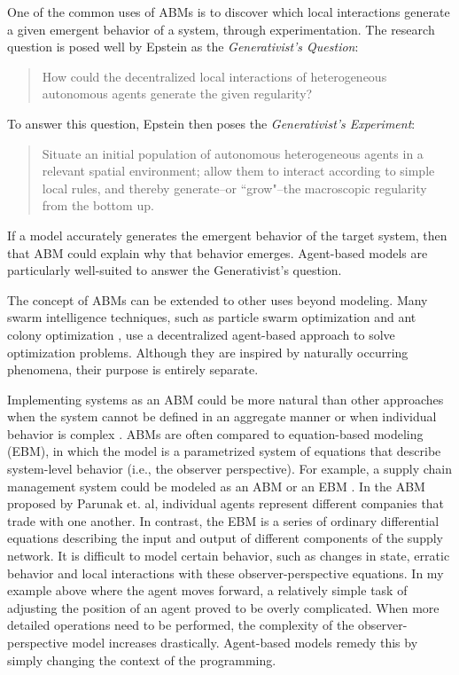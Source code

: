 One of the common uses of ABMs is to discover which local interactions generate a given emergent behavior of a system, through experimentation.
The research question is posed well by Epstein as the \textit{Generativist's Question}:
\begin{quote}
   How could the decentralized local interactions of heterogeneous autonomous agents generate the given regularity?
\end{quote}
To answer this question, Epstein then poses the \textit{Generativist's Experiment}:
\begin{quote}
Situate an initial population of autonomous heterogeneous agents in a relevant spatial environment; allow them to interact according to simple local rules, and thereby generate--or ``grow"--the macroscopic regularity from the bottom up. \cite{epstein1999agent}
\end{quote}
If a model accurately generates the emergent behavior of the target system, then that ABM could explain why that behavior emerges.
Agent-based models are particularly well-suited to answer the Generativist's question.

The concept of ABMs can be extended to other uses beyond modeling.
Many swarm intelligence techniques, such as particle swarm optimization \cite{kennedy1995pso} and ant colony optimization \cite{dorigo2004aco}, use a decentralized agent-based approach to solve optimization problems.
Although they are inspired by naturally occurring phenomena, their purpose is entirely separate.

Implementing systems as an ABM could be more natural than other approaches when the system cannot be defined in an aggregate manner or when individual behavior is complex \cite{bonabeau2002agent}.
ABMs are often compared to equation-based modeling (EBM), in which the model is a parametrized system of equations that describe system-level behavior (i.e., the observer perspective).
For example, a supply chain management system could be modeled as an ABM or an EBM \cite{parunak1998agent}.
In the ABM proposed by Parunak et. al, individual agents represent different companies that trade with one another.
In contrast, the EBM is a series of ordinary differential equations describing the input and output of different components of the supply network.
It is difficult to model certain behavior, such as changes in state, erratic behavior and local interactions with these observer-perspective equations.
In my example above where the agent moves forward, a relatively simple task of adjusting the position of an agent proved to be overly complicated.
When more detailed operations need to be performed, the complexity of the observer-perspective model increases drastically.
Agent-based models remedy this by simply changing the context of the programming.

